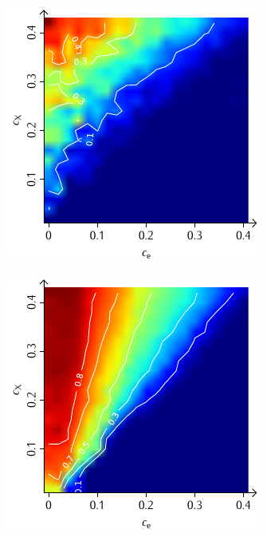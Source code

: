 \documentclass[a4paper, 10pt, twoside, openany]{book} %
\begin{document}
\begin{figure}
\begin{minipage}[t]{0.48\textwidth}
        \label{F_random_K}
    \end{minipage}
    \hfill
    \begin{minipage}[t]{0.48\textwidth}
        \includegraphics[width=\textwidth]{Abbildungen/Phasendiagramme/Konturen/F_penalty_random_K.pdf}
        \label{F_penalty_random_K}
    \end{minipage}
    \begin{minipage}[t]{0.48\textwidth}
        \includegraphics[width=\textwidth]{Abbildungen/Phasendiagramme/Konturen/F_individual_K.pdf}

\end{minipage}
\end{figure}
\end{document}
